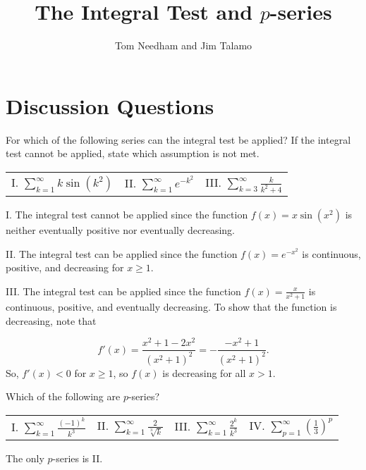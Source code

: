 \documentclass[noauthor]{ximera}
\author{Tom Needham and Jim Talamo}
\title[]{The Integral Test and $p$-series}
\begin{document}
\begin{abstract}
\end{abstract}
\maketitle

\vspace{-0.9in}

\section{Discussion Questions}

\begin{problem}
For which of the following series can the integral test be applied?  If the integral test cannot be applied, state which assumption is not met.

\begin{center}
\begin{tabular}{lll}
I. $\sum_{k=1}^{\infty} k \sin(k^2)$ \hspace{10mm} & II. $\sum_{k=1}^{\infty} e^{-k^2}$ \hspace{10mm} & III.  $\sum_{k=3}^{\infty} \frac{k}{k^2+4}$
\end{tabular}
\end{center}

\begin{freeResponse}
I. The integral test cannot be applied since the function $f(x) = x \sin\left(x^2\right)$ is neither eventually positive nor eventually decreasing.

II. The integral test can be applied since the function $f(x) = e^{-x^2}$ is continuous, positive, and decreasing for $x \geq 1$.

III. The integral test can be applied since the function $f(x) = \frac{x}{x^2+1}$ is continuous, positive, and eventually decreasing. To show that the function is decreasing, note that 

\[
f'(x) = \frac{x^2+1 - 2x^2}{\left(x^2+1\right)^2} = -\frac{-x^2+1}{\left(x^2+1\right)^2}.
\]
So, $f'(x)<0$ for $x \geq 1$, so $f(x)$ is decreasing for all $x >1$.


\end{freeResponse}
\end{problem}

\begin{problem}
Which of the following are $p$-series?

\begin{center}
\begin{tabular}{llll}
I. $\sum_{k=1}^{\infty} \frac{(-1)^k}{k^3}$ \hspace{5mm} & II. $\sum_{k=1}^{\infty} \frac{2}{\sqrt[3]{k}}$ \hspace{5mm} & III.  $\sum_{k=1}^{\infty} \frac{2^k}{k^3}$ \hspace{5mm} & IV. $\sum_{p=1}^{\infty} \left(\frac{1}{3}\right)^p$
\end{tabular}
\end{center}

\begin{freeResponse}
The only $p$-series is II.
\end{freeResponse}
\end{problem}
\end{document}
